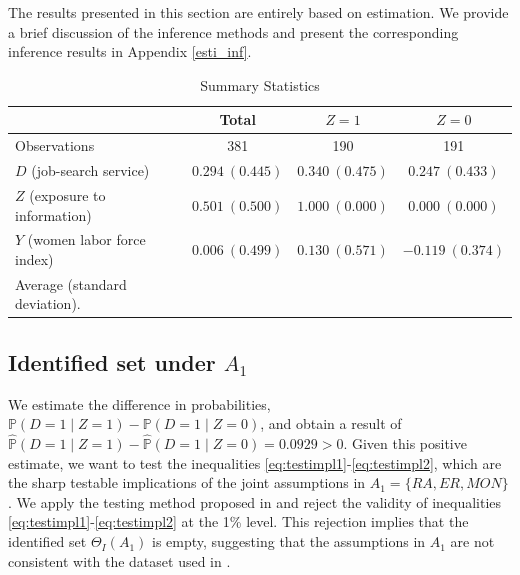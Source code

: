 \documentclass[12pt]{article}
\theoremstyle{plain}
\theoremstyle{definition}
\theoremstyle{remark}
\begin{document}
The results presented in this section are entirely based on estimation. We provide a brief discussion of the inference methods and present the corresponding inference results in Appendix \ref{esti_inf}.

\begin{table}
	\centering
 \caption{Summary Statistics} 
\begin{tabular}{lccc}
\toprule
& Total & $Z = 1$ & $Z = 0$ \\
\midrule
Observations & 381 & 190 & 191 \\
$D$  (job-search service) & $0.294\ (0.445)$ & $0.340\ (0.475)$ & $0.247\ (0.433)$ \\
$Z$  (exposure to information) & $0.501\ (0.500)$ & $1.000\ (0.000)$ & $0.000\ (0.000)$ \\
$Y$  (women labor force index) & $0.006\ (0.499)$ & $0.130\ (0.571)$ & $-0.119\ (0.374)$ \\
\bottomrule 
Average (standard deviation).
\end{tabular}
\label{cardsum}
\end{table}

\subsection{Identified set under $A_1$}
We estimate the difference in probabilities, $\mathbb{P}(D=1 \mid Z=1)-\mathbb{P}(D=1 \mid Z=0)$, and obtain a result of $\hat{\mathbb{P}}(D=1 \mid Z=1)-\hat{\mathbb{P}}(D=1 \mid Z=0) = 0.0929 > 0$. Given this positive estimate, we want to test the inequalities \eqref{eq:testimpl1}-\eqref{eq:testimpl2}, which are the sharp testable implications of the joint assumptions in $A_1 = \{RA, ER, MON\}$. We apply the testing method proposed in \cite{Mourifie2017TestingAssumptions} and reject the validity of inequalities \eqref{eq:testimpl1}-\eqref{eq:testimpl2} at the 1\% level. This rejection implies that the identified set $\Theta_I(A_1)$ is empty, suggesting that the assumptions in $A_1$ are not consistent with the dataset used in \cite{bursztyn2020misperceived}.
\end{document}
